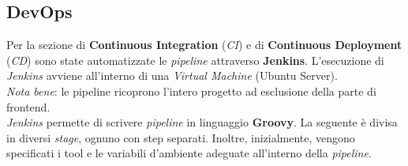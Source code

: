 \documentclass{article}
\begin{document}
\subsection{DevOps}
Per la sezione di \textbf{Continuous Integration} (\textit{CI}) e di \textbf{Continuous Deployment} (\textit{CD}) sono state automatizzate le \textit{pipeline} attraverso \textbf{Jenkins}. L'esecuzione di \textit{Jenkins} avviene all'interno di una \textit{Virtual Machine} (Ubuntu Server).\vspace*{7pt}\\
\textit{Nota bene}: le pipeline ricoprono l’intero progetto ad esclusione della parte di frontend.\vspace*{7pt}\\
\textit{Jenkins} permette di scrivere \textit{pipeline} in linguaggio \textbf{Groovy}. La seguente è divisa in diversi \textit{stage}, ognuno con step separati. Inoltre, inizialmente, vengono specificati i tool e le variabili d'ambiente adeguate all'interno della \textit{pipeline}.\vspace*{7pt}
\end{document}
